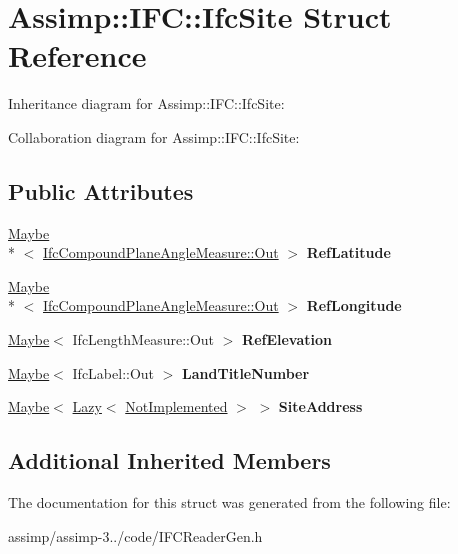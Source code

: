 \hypertarget{struct_assimp_1_1_i_f_c_1_1_ifc_site}{\section{Assimp\+:\+:I\+F\+C\+:\+:Ifc\+Site Struct Reference}
\label{struct_assimp_1_1_i_f_c_1_1_ifc_site}
}


Inheritance diagram for Assimp\+:\+:I\+F\+C\+:\+:Ifc\+Site\+:


Collaboration diagram for Assimp\+:\+:I\+F\+C\+:\+:Ifc\+Site\+:
\subsection*{Public Attributes}
\begin{DoxyCompactItemize}
\item 
\hypertarget{struct_assimp_1_1_i_f_c_1_1_ifc_site_a5db8fa002d31014bcc9cbb93403d20ef}{\hyperlink{struct_assimp_1_1_s_t_e_p_1_1_maybe}{Maybe}\\*
$<$ \hyperlink{struct_assimp_1_1_s_t_e_p_1_1_list_of}{Ifc\+Compound\+Plane\+Angle\+Measure\+::\+Out} $>$ {\bfseries Ref\+Latitude}}\label{struct_assimp_1_1_i_f_c_1_1_ifc_site_a5db8fa002d31014bcc9cbb93403d20ef}

\item 
\hypertarget{struct_assimp_1_1_i_f_c_1_1_ifc_site_a4be903db3c1e0144d23cecae377d67dc}{\hyperlink{struct_assimp_1_1_s_t_e_p_1_1_maybe}{Maybe}\\*
$<$ \hyperlink{struct_assimp_1_1_s_t_e_p_1_1_list_of}{Ifc\+Compound\+Plane\+Angle\+Measure\+::\+Out} $>$ {\bfseries Ref\+Longitude}}\label{struct_assimp_1_1_i_f_c_1_1_ifc_site_a4be903db3c1e0144d23cecae377d67dc}

\item 
\hypertarget{struct_assimp_1_1_i_f_c_1_1_ifc_site_aac3c4e7d2224b2c2ee1011d66ac9b0fc}{\hyperlink{struct_assimp_1_1_s_t_e_p_1_1_maybe}{Maybe}$<$ Ifc\+Length\+Measure\+::\+Out $>$ {\bfseries Ref\+Elevation}}\label{struct_assimp_1_1_i_f_c_1_1_ifc_site_aac3c4e7d2224b2c2ee1011d66ac9b0fc}

\item 
\hypertarget{struct_assimp_1_1_i_f_c_1_1_ifc_site_a68632b70e1a1c7d327bf7c14258c172c}{\hyperlink{struct_assimp_1_1_s_t_e_p_1_1_maybe}{Maybe}$<$ Ifc\+Label\+::\+Out $>$ {\bfseries Land\+Title\+Number}}\label{struct_assimp_1_1_i_f_c_1_1_ifc_site_a68632b70e1a1c7d327bf7c14258c172c}

\item 
\hypertarget{struct_assimp_1_1_i_f_c_1_1_ifc_site_afd7272be843fb8abf42017015cab6c38}{\hyperlink{struct_assimp_1_1_s_t_e_p_1_1_maybe}{Maybe}$<$ \hyperlink{struct_assimp_1_1_s_t_e_p_1_1_lazy}{Lazy}$<$ \hyperlink{struct_assimp_1_1_i_f_c_1_1_not_implemented}{Not\+Implemented} $>$ $>$ {\bfseries Site\+Address}}\label{struct_assimp_1_1_i_f_c_1_1_ifc_site_afd7272be843fb8abf42017015cab6c38}

\end{DoxyCompactItemize}
\subsection*{Additional Inherited Members}


The documentation for this struct was generated from the following file\+:\begin{DoxyCompactItemize}
\item 
assimp/assimp-\/3../code/I\+F\+C\+Reader\+Gen.\+h\end{DoxyCompactItemize}
